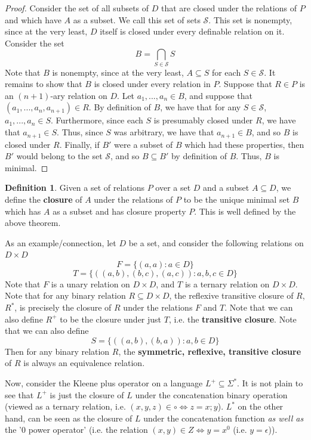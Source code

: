 \documentclass{article}
\theoremstyle{definition}
\newtheorem{definition}{Definition}[section]
\theoremstyle{plain}
\theoremstyle{theorem}
\begin{document}
\begin{proof}
	Consider the set of all subsets of $D$ that are closed under the relations of $P$ and which have $A$ as a subset. We call this set of sets $\mathcal{S}$. This set is nonempty, since at the very least, $D$ itself is closed under every definable relation on it. Consider the set 
	\[ B = \bigcap_{S \in \mathcal{S}} S \]
Note that $B$ is nonempty, since at the very least, $A \subseteq S$ for each $S \in \mathcal{S}$. It remains to show that $B$ is closed under every relation in $P$. Suppose that $R \in P$ is an $(n+1)$-ary relation on $D$. Let $a_1,...,a_n \in B$, and suppose that $(a_1,...,a_n,a_{n+1}) \in R$. By definition of $B$, we have that for any $S \in \mathcal{S}$, $a_1,...,a_n \in S$. Furthermore, since each $S$ is presumably closed under $R$, we have that $a_{n+1} \in S$. Thus, since $S$ was arbitrary, we have that $a_{n+1} \in B$, and so $B$ is closed under $R$. Finally, if $B'$ were a subset of $B$ which had these properties, then $B'$ would belong to the set $\mathcal{S}$, and so $B \subseteq B'$ by definition of $B$. Thus, $B$ is minimal. 	
\end{proof}
\begin{definition}
	Given a set of relations $P$ over a set $D$ and a subset $A \subseteq D$, we define the \textbf{closure} of $A$ under the relations of $P$ to be the unique minimal set $B$ which has $A$ as a subset and has closure property $P$. This is well defined by the above theorem.
\end{definition}
As an example/connection, let $D$ be a set, and consider the following relations on $D \times D$
 \[ F = \{ (a,a): a \in D \} \]
 \[ T = \{ ((a,b),(b,c),(a,c)): a,b,c \in D \} \]
 Note that $F$ is a unary relation on $D \times D$, and $T$ is a ternary relation on $D \times D$. Note that for any binary relation $R \subseteq D \times D$, the reflexive transitive closure of $R$, $R^*$, is precisely the closure of $R$ under the relations $F$ and $T$. Note that we can also define $R^+$ to be the closure under just $T$, i.e. the \textbf{transitive closure}. Note that we can also define
  \[ S = \{ ((a,b),(b,a)): a,b \in D \} \]
Then for any binary relation $R$, the \textbf{symmetric, reflexive, transitive closure} of $R$ is always an equivalence relation. 
 \par Now, consider the Kleene plus operator on a language $L^+ \subseteq \Sigma^*$. It is not plain to see that $L^+$ is just the closure of $L$ under the concatenation binary operation (viewed as a ternary relation, i.e. $(x,y,z) \in \circ \iff z = x;y$). $L^*$ on the other hand, can be seen as the closure of $L$ under the concatenation function \textit{as well as} the '$0$ power operator' (i.e. the relation $(x,y) \in Z \iff y = x^0$ (i.e. $y = \epsilon$)).
\end{document}
